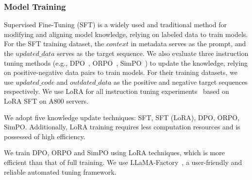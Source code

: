 \subsubsection{Model Training}
Supervised Fine-Tuning (SFT) is a widely used and traditional method for modifying and aligning model knowledge, relying on labeled data to train models.
For the SFT training dataset, the $context$ in metadata serves as the prompt, and the $updated\_data$ serves as the target sequence.
We also evaluate three instruction tuning methods (e.g., DPO~\cite{rafailov2023dpo}, ORPO~\cite{hong2024orpo}, SimPO~\cite{hong2024orpo}) to update the knowledge, relying on positive-negative data pairs to train models.
For their training datasets, we use $updated\_code$ and $outdated\_data$ as the positive and negative target sequences respectively.
We use LoRA for all instruction tuning experiments~\citep{hu2021lora} based on LoRA SFT on A800 servers. 

We adopt five knowledge update techniques: SFT, SFT (LoRA), DPO, ORPO, SimPO. Additionally, LoRA training requires less computation resources and is possessed of high efficiency.

We train DPO, ORPO and SimPO using LoRA techniques, which is more efficient than that of full training. 
We use LLaMA-Factory~\cite{zheng2024llamafactory}, a user-friendly and reliable automated tuning framework.


